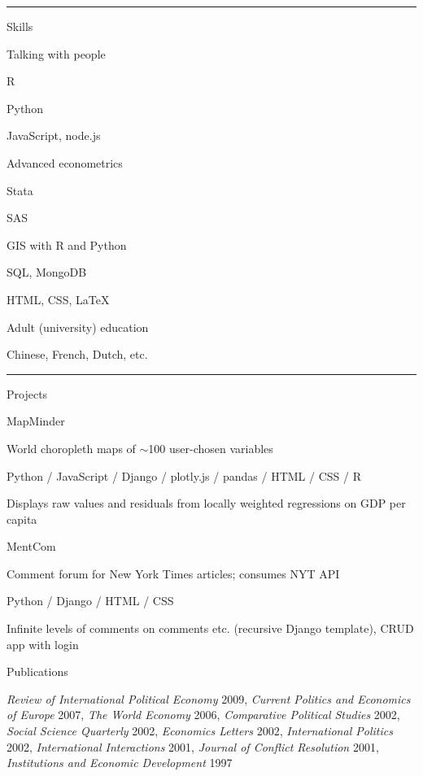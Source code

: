 \documentclass[letterpaper, english, 11pt]{article}
\newenvironment{packed_itemize}{
	\begin{itemize}
		\setlength{\itemsep}{1pt}
		\setlength{\parskip}{2pt}
		\setlength{\parsep}{2pt}
	} {\end{itemize}
}
\begin{document}
\hrule
 
Skills

\begin{footnotesize}
\begin{multicols}{3}
	\begin{packed_itemize}
		\item{Talking with people}
		\item R
		\item Python
		\item JavaScript, node.js
		\item Advanced econometrics
		\item Stata
		\item SAS
		\item GIS with R and Python
		\item SQL, MongoDB
		\item HTML, CSS, \LaTeX
		\item Adult (university) education
		\item Chinese, French, Dutch, etc.
	\end{packed_itemize}
\end{multicols}
\end{footnotesize}
\vspace{2pt}
\hrule

Projects

\begin{footnotesize}
	\begin{packed_itemize}
		\item{MapMinder}
			\begin{packed_itemize}
				\item World choropleth maps of $\sim$100 user-chosen variables
				\item Python / JavaScript  / Django / plotly.js / pandas / HTML / CSS / R
				\item Displays raw values and residuals from locally weighted regressions on GDP per capita
			\end{packed_itemize}
		\item{MentCom}
			\begin{packed_itemize}
				\item Comment forum for New York Times articles; consumes NYT API
				\item Python / Django / HTML / CSS
				\item Infinite levels of comments on comments etc. (recursive Django template), CRUD app with login
			\end{packed_itemize}
		\item{Publications}
			\begin{packed_itemize}
			\item \emph {Review of International Political Economy} 2009, \emph{Current Politics and Economics of Europe} 2007, \emph{The World Economy} 2006, \emph{Comparative Political Studies} 2002, \emph{Social Science Quarterly} 2002, \emph{Economics Letters} 2002, \emph{International Politics} 2002, \emph{International Interactions} 2001, \emph{Journal of Conflict Resolution} 2001, \emph{Institutions and Economic Development} 1997
		\end{packed_itemize}
	\end{packed_itemize}
\end{footnotesize}
\end{document}

